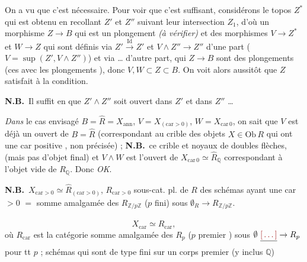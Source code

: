 \documentclass[11pt,a4paper]{article}
\begin{document}
On a vu que c'est nécessaire. Pour voir que c'est suffisant, considérons le
topos $Z^{*}$ qui est obtenu en recollant $Z'$ et $Z''$ suivant leur
intersection $Z_{1}$, d'où un morphisme $Z \to B$ qui est un plongement
\emph{(à vérifier)} et des morphismes $V \to Z^{*}$ et $W \to Z$ qui sont
définis via $Z' \xrightarrow{\ \mathrm{Id}\ } Z'$ et $V \wedge Z'' \to Z''$
d'une part \struck{\ill{}} ($V = \sup(Z', V \wedge Z'')$) et via … d'autre
part, qui \struck{\ill{}} $Z \to B$ \ill{} sont des plongements (ces
 avec \ill{}  les plongements
), donc $V, W \subset Z \subset B$. On voit alors aussitôt
que $Z$ satisfait à la condition.

\textbf{N.B.}\ Il suffit en  que $Z' \wedge Z''$ soit
ouvert dans $Z'$ et dans $Z''$ …

\emph{Dans} le cas envisagé $B = \hat{R} = X_{\mathrm{ann}}$, $V =
X_{(\mathrm{car} > 0)}$, $W = X_{\mathrm{car}\,0}$, on sait que $V$ est déjà un
ouvert de $B = \hat{R}$ (correspondant au crible des objets $X \in
\mathrm{Ob}\,R$ qui ont une car positive \struck{\ill{}}, non précisée) ;
\textbf{N.B.}\ ce crible    et noyaux de doubles flèches, (mais pas d'objet
final) et $V \wedge W$ est l'ouvert de $X_{\mathrm{car}\,0} \simeq
\hat{R}_{\mathbb{Q}}$ correspondant à  l'objet vide
 de $R_{\mathbb{Q}}$. Donc \emph{OK}.

\textbf{N.B.}\ $X_{\mathrm{car} > 0} \simeq \hat{R}_{(\mathrm{car} > 0)}$,
$R_{\mathrm{car} > 0}$ sous-cat. pl. de $R$ des schémas ayant une car $> 0$ $=$
somme amalgamée des $R_{\mathbb{Z}/p\mathbb{Z}}$ ($p$ fini) sous
$\emptyset_{R} \to R_{\mathbb{Z}/p\mathbb{Z}}$.


\[
  X_{\mathrm{car}} \simeq \hat{R}_{\mathrm{car}},
\]
où $R_{\mathrm{car}}$ est la catégorie somme amalgamée des $R_{p}$ ($p$
premier \struck{\ill{}}) sous $\emptyset\ \struck{\ill{}} \to R_{p}$ pour tt
$p$ ;  schémas \struck{\ill{}} qui sont de type fini
sur un corps
premier (y inclus $\mathbb{Q}$) \struck{\ill{}}
\end{document}
